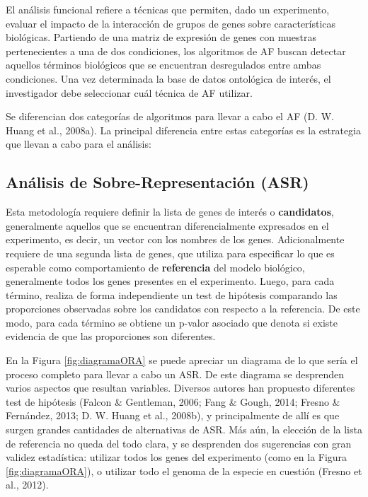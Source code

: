 \documentclass[12pt,twoside]{reedthesis}
\begin{document}
El análisis funcional refiere a técnicas que permiten, dado un experimento, evaluar el impacto de la interacción de grupos de genes sobre características biológicas. Partiendo de una matriz de expresión de genes con muestras pertenecientes a una de dos condiciones, los algoritmos de AF buscan detectar aquellos términos biológicos que se encuentran desregulados entre ambas condiciones. Una vez determinada la base de datos ontológica de interés, el investigador debe seleccionar cuál técnica de AF utilizar.

\par

Se diferencian dos categorías de algoritmos para llevar a cabo el AF (D. W. Huang et al., 2008a). La principal diferencia entre estas categorías es la estrategia que llevan a cabo para el análisis:

\hypertarget{sec:asr}{%
\subsection{Análisis de Sobre-Representación (ASR)}\label{sec:asr}}

Esta metodología requiere definir la lista de genes de interés o \textbf{candidatos}, generalmente aquellos que se encuentran diferencialmente expresados en el experimento, es decir, un vector con los nombres de los genes. Adicionalmente requiere de una segunda lista de genes, que utiliza para especificar lo que es esperable como comportamiento de \textbf{referencia} del modelo biológico, generalmente todos los genes presentes en el experimento. Luego, para cada término, realiza de forma independiente un test de hipótesis comparando las proporciones observadas sobre los candidatos con respecto a la referencia. De este modo, para cada término se obtiene un p-valor asociado que denota si existe evidencia de que las proporciones son diferentes.

\par

En la Figura \ref{fig:diagramaORA} se puede apreciar un diagrama de lo que sería el proceso completo para llevar a cabo un ASR. De este diagrama se desprenden varios aspectos que resultan variables. Diversos autores han propuesto diferentes test de hipótesis (Falcon \& Gentleman, 2006; Fang \& Gough, 2014; Fresno \& Fernández, 2013; D. W. Huang et al., 2008b), y principalmente de allí es que surgen grandes cantidades de alternativas de ASR. Más aún, la elección de la lista de referencia no queda del todo clara, y se desprenden dos sugerencias con gran validez estadística: utilizar todos los genes del experimento (como en la Figura \ref{fig:diagramaORA}), o utilizar todo el genoma de la especie en cuestión (Fresno et al., 2012).
\end{document}
